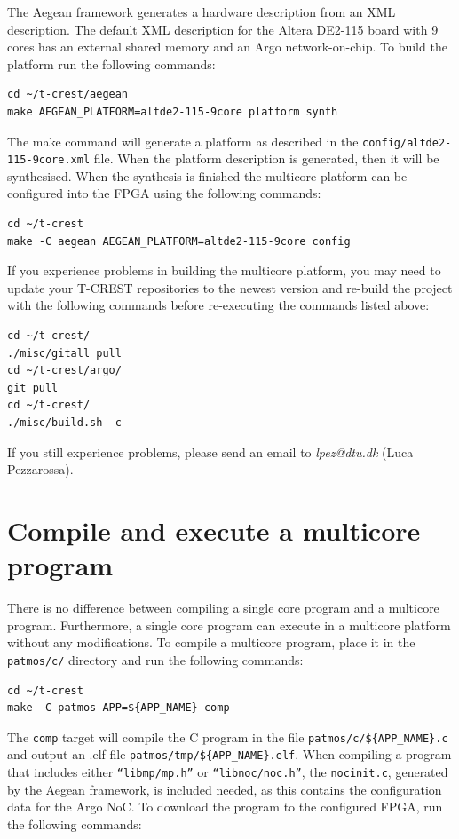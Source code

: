 \documentclass[a4paper,fontsize=10pt,twoside,DIV15,BCOR12mm,headinclude=true,footinclude=false,pagesize,bibtotoc]{scrbook}
\newcommand{\code}[1]{{\texttt{#1}}}
\begin{document}
The Aegean framework generates a hardware description from an
XML description.
The default XML description for the Altera DE2-115 board with 9 cores
has an external shared memory and an Argo network-on-chip.
To build the platform run the following commands:
\begin{Verbatim}
cd ~/t-crest/aegean
make AEGEAN_PLATFORM=altde2-115-9core platform synth
\end{Verbatim}
The make command will generate a platform as described in the
\code{config/altde2-115-9core.xml} file.
When the platform description is generated, then it will be synthesised.
When the synthesis is finished the multicore platform can be
configured into the FPGA using the following commands:
\begin{Verbatim}
cd ~/t-crest
make -C aegean AEGEAN_PLATFORM=altde2-115-9core config
\end{Verbatim}

If you experience problems in building the multicore platform, you may need to update your T-CREST repositories to the newest version and re-build the project with the following commands before re-executing the commands listed above:
\begin{Verbatim}
cd ~/t-crest/
./misc/gitall pull
cd ~/t-crest/argo/
git pull
cd ~/t-crest/
./misc/build.sh -c
\end{Verbatim}

If you still experience problems, please send an email to \textit{lpez@dtu.dk} (Luca Pezzarossa).

\section{Compile and execute a multicore program}
\label{apx:buildsw}

There is no difference between compiling a single core program and a multicore program.
Furthermore, a single core program can execute in a multicore
platform without any modifications.
To compile a multicore program, place it in the \code{patmos/c/} directory
and run the following commands:

\begin{Verbatim}
cd ~/t-crest
make -C patmos APP=${APP_NAME} comp
\end{Verbatim}

The \code{comp} target will compile the C program in the file \code{patmos/c/\$\{APP\_NAME\}.c}
and output an .elf file \code{patmos/tmp/\$\{APP\_NAME\}.elf}.
When compiling a program that includes either \code{``libmp/mp.h''} or \code{``libnoc/noc.h''},
the \code{nocinit.c}, generated by the Aegean framework, is included needed,
as this contains the configuration data for the Argo NoC.
To download the program to the configured FPGA, run the following commands:
\end{document}
